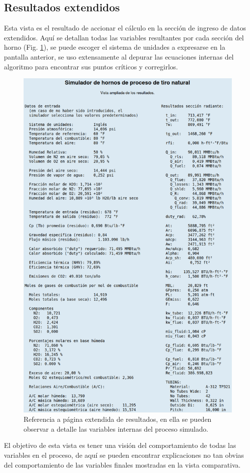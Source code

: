 \subsection{Resultados extendidos}
\par Esta vista es el resultado de accionar el cálculo en la sección de ingreso de datos extendidos. Aquí se detallan todas las variables resultantes por cada sección del horno (Fig. \ref{fig:fullresultados}), se puede escoger el sistema de unidades a expresarse en la pantalla anterior, se uso extensamente al depurar las ecuaciones internas del algoritmo para encontrar sus puntos críticos y corregirlos.
\begin{figure}[H] \begin{center}
\includegraphics[scale=0.3]{images/result2}
\caption[Página extendida de resultados]{Referencia a página extendida de resultados, en ella se pueden observar a detalle las variables internas del proceso simulado.}
\label{fig:fullresultados} \end{center} \end{figure}
\par El objetivo de esta vista es tener una visión del comportamiento de todas las variables en el proceso, de aquí se pueden encontrar explicaciones no tan obvias del comportamiento de las variables finales mostradas en la vista comparativa.

